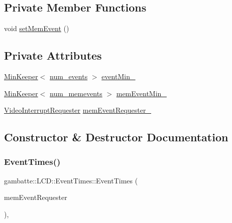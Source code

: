 \subsection*{Private Member Functions}
\begin{DoxyCompactItemize}
\item 
void \hyperlink{classgambatte_1_1LCD_1_1EventTimes_ab68dd9387d02b101f99adfffacb767f2}{set\+Mem\+Event} ()
\end{DoxyCompactItemize}
\subsection*{Private Attributes}
\begin{DoxyCompactItemize}
\item 
\hyperlink{classMinKeeper}{Min\+Keeper}$<$ \hyperlink{classgambatte_1_1LCD_a3f0d3ac1c0181cd4a083153515f43ec7a424a70f3d84f9af6281b1e034596f9cb}{num\+\_\+events} $>$ \hyperlink{classgambatte_1_1LCD_1_1EventTimes_a0a42dc4b789e866e6536313b44f9830d}{event\+Min\+\_\+}
\item 
\hyperlink{classMinKeeper}{Min\+Keeper}$<$ \hyperlink{classgambatte_1_1LCD_aa553646ad64f768ac0e781a5ccdde8a7a6f114e0d7de033bab11a657b9065edab}{num\+\_\+memevents} $>$ \hyperlink{classgambatte_1_1LCD_1_1EventTimes_afe898d5fd9e0c9df4d3516703059e8cb}{mem\+Event\+Min\+\_\+}
\item 
\hyperlink{classgambatte_1_1VideoInterruptRequester}{Video\+Interrupt\+Requester} \hyperlink{classgambatte_1_1LCD_1_1EventTimes_a3525ab9f34295420abdc8ca41de7829a}{mem\+Event\+Requester\+\_\+}
\end{DoxyCompactItemize}


\subsection{Constructor \& Destructor Documentation}
\mbox{\label{classgambatte_1_1LCD_1_1EventTimes_a1fa6d56defc84f65eb5d1a317091afc8}} 
\subsubsection{\texorpdfstring{Event\+Times()}{EventTimes()}}
{\footnotesize\ttfamily gambatte\+::\+L\+C\+D\+::\+Event\+Times\+::\+Event\+Times (\begin{DoxyParamCaption}\item[{\hyperlink{classgambatte_1_1VideoInterruptRequester}{Video\+Interrupt\+Requester}}]{mem\+Event\+Requester }\end{DoxyParamCaption})\hspace{0.3cm}{\ttfamily [inline]}, {\ttfamily [explicit]}}



